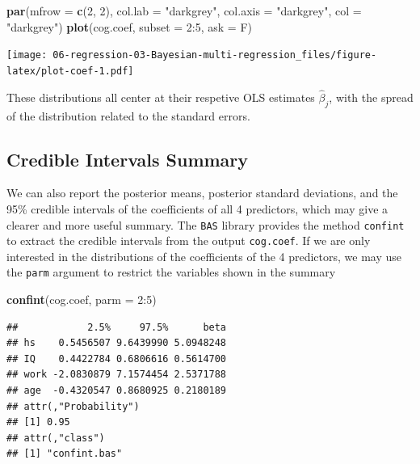 \documentclass[]{book}
\newenvironment{Shaded}{\begin{snugshade}}{\end{snugshade}}
\newcommand{\KeywordTok}[1]{\textcolor[rgb]{0.13,0.29,0.53}{\textbf{{#1}}}}
\newcommand{\DataTypeTok}[1]{\textcolor[rgb]{0.13,0.29,0.53}{{#1}}}
\newcommand{\DecValTok}[1]{\textcolor[rgb]{0.00,0.00,0.81}{{#1}}}
\newcommand{\StringTok}[1]{\textcolor[rgb]{0.31,0.60,0.02}{{#1}}}
\newcommand{\NormalTok}[1]{{#1}}
\theoremstyle{definition}
\theoremstyle{definition}
\theoremstyle{definition}
\theoremstyle{remark}
\begin{document}
\begin{Shaded}
\begin{Highlighting}[]
\KeywordTok{par}\NormalTok{(}\DataTypeTok{mfrow =} \KeywordTok{c}\NormalTok{(}\DecValTok{2}\NormalTok{, }\DecValTok{2}\NormalTok{), }\DataTypeTok{col.lab =} \StringTok{"darkgrey"}\NormalTok{, }\DataTypeTok{col.axis =} \StringTok{"darkgrey"}\NormalTok{, }\DataTypeTok{col =} \StringTok{"darkgrey"}\NormalTok{)}
\KeywordTok{plot}\NormalTok{(cog.coef, }\DataTypeTok{subset =} \DecValTok{2}\NormalTok{:}\DecValTok{5}\NormalTok{, }\DataTypeTok{ask =} \NormalTok{F)}
\end{Highlighting}
\end{Shaded}

\texttt{[image: 06-regression-03-Bayesian-multi-regression\_files/figure-latex/plot-coef-1.pdf]}

These distributions all center at their respetive OLS estimates
\(\hat{\beta}_j\), with the spread of the distribution related to the
standard errors.

\subsection{Credible Intervals
Summary}\label{credible-intervals-summary}

We can also report the posterior means, posterior standard deviations,
and the 95\% credible intervals of the coefficients of all 4 predictors,
which may give a clearer and more useful summary. The \texttt{BAS}
library provides the method \texttt{confint} to extract the credible
intervals from the output \texttt{cog.coef}. If we are only interested
in the distributions of the coefficients of the 4 predictors, we may use
the \texttt{parm} argument to restrict the variables shown in the
summary

\begin{Shaded}
\begin{Highlighting}[]
\KeywordTok{confint}\NormalTok{(cog.coef, }\DataTypeTok{parm =} \DecValTok{2}\NormalTok{:}\DecValTok{5}\NormalTok{)}
\end{Highlighting}
\end{Shaded}

\begin{verbatim}
##            2.5%     97.5%      beta
## hs    0.5456507 9.6439990 5.0948248
## IQ    0.4422784 0.6806616 0.5614700
## work -2.0830879 7.1574454 2.5371788
## age  -0.4320547 0.8680925 0.2180189
## attr(,"Probability")
## [1] 0.95
## attr(,"class")
## [1] "confint.bas"
\end{verbatim}
\end{document}
